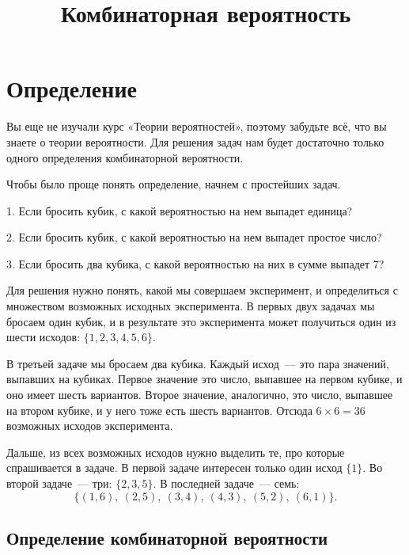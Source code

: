 \documentclass{article}
\title{Комбинаторная вероятность}
\author{}
\date{}
\newenvironment{exercise}{%
\begin{framed}\par\noindent\slshape%
}%
{\end{framed}}
\begin{document}
\maketitle

\section{Определение}
Вы еще не изучали курс «Теории вероятностей», поэтому забудьте всё, что вы знаете о теории вероятности. Для решения задач нам будет достаточно только одного определения комбинаторной вероятности.

Чтобы было проще понять определение, начнем с простейших задач.

\begin{exercise}
1. Если бросить кубик, с какой вероятностью на нем выпадет единица?
\end{exercise}

\begin{exercise}
2.	Если бросить кубик, с какой вероятностью на нем выпадет простое число?
\end{exercise}

\begin{exercise}
3.	Если бросить два кубика, с какой вероятностью на них в сумме выпадет 7?
\end{exercise}

Для решения нужно понять, какой мы совершаем эксперимент, и определиться с множеством возможных исходных эксперимента. В первых двух задачах мы бросаем один кубик, и в результате это эксперимента может получиться один из шести исходов: $\{1, 2, 3, 4, 5, 6\}$.

В третьей задаче мы бросаем два кубика. Каждый исход~--- это пара значений, выпавших на кубиках. Первое значение это число, выпавшее на первом кубике, и оно имеет шесть вариантов. Второе значение, аналогично, это число, выпавшее на втором кубике, и у него тоже есть шесть вариантов. Отсюда $6\times6=36$ возможных исходов эксперимента.

Дальше, из всех возможных исходов нужно выделить те, про которые спрашивается в задаче. В первой задаче интересен только один исход $\{1\}$. Во второй задаче~--- три: $\{2, 3, 5\}$. В последней задаче~--- семь: $$\{(1,6),\ (2, 5),\ (3, 4),\ (4, 3),\ (5, 2),\ (6, 1)\}.$$

\subsection{Определение комбинаторной вероятности}
\end{document}

